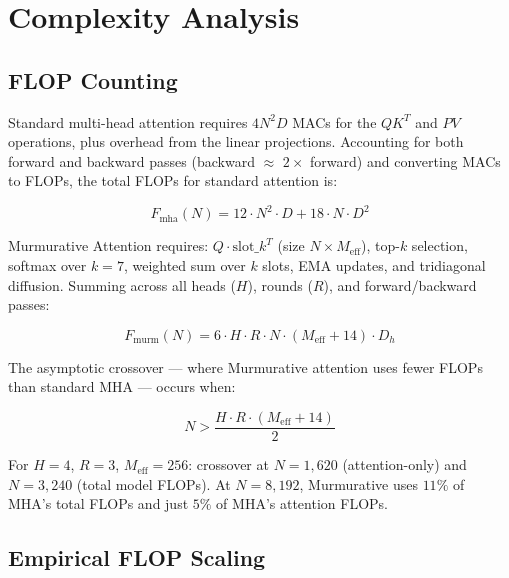 \documentclass{article}
\begin{document}
\section{Complexity Analysis}

\subsection{FLOP Counting}

Standard multi-head attention requires $4N^2D$ MACs for the $QK^T$ and $PV$ operations, plus overhead from the linear projections. Accounting for both forward and backward passes (backward $\approx$ $2\times$ forward) and converting MACs to FLOPs, the total FLOPs for standard attention is:

\begin{equation}
F_{\mathrm{mha}}(N) = 12 \cdot N^2 \cdot D + 18 \cdot N \cdot D^2
\label{eq:mha-flops}
\end{equation}

Murmurative Attention requires: $Q \cdot \mathrm{slot\_}k^T$ (size $N \times M_{\mathrm{eff}}$), top-$k$ selection, softmax over $k=7$, weighted sum over $k$ slots, EMA updates, and tridiagonal diffusion. Summing across all heads ($H$), rounds ($R$), and forward/backward passes:

\begin{equation}
F_{\mathrm{murm}}(N) = 6 \cdot H \cdot R \cdot N \cdot (M_{\mathrm{eff}} + 14) \cdot D_h
\label{eq:murm-flops}
\end{equation}

The asymptotic crossover — where Murmurative attention uses fewer FLOPs than standard MHA — occurs when:

\begin{equation}
N > \frac{H \cdot R \cdot (M_{\mathrm{eff}} + 14)}{2}
\label{eq:crossover}
\end{equation}

For $H = 4$, $R = 3$, $M_{\mathrm{eff}} = 256$: crossover at $N = 1{,}620$ (attention-only) and $N = 3{,}240$ (total model FLOPs). At $N = 8{,}192$, Murmurative uses $11\%$ of MHA's total FLOPs and just $5\%$ of MHA's attention FLOPs.

\subsection{Empirical FLOP Scaling}
\end{document}
